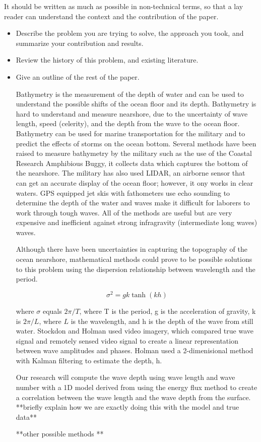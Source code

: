 It should be written as much as possible in non-technical terms, so that a
lay reader can understand the context and the contribution of the paper.

\begin{itemize}

\item Describe the problem you are trying to solve, the approach
you took, and summarize your contribution and results.

\item Review the history of this problem, and existing literature.

\item Give an outline of the rest of the paper.

Bathymetry is the measurement of the depth of water and can be used to understand the possible shifts of the ocean floor and its depth. Bathymetry is hard to understand and measure nearshore, due to the uncertainty of wave length, speed (celerity), and the depth from the wave to the ocean floor. Bathymetry can be used for marine transportation for the military and to predict the effects of storms on the ocean bottom. Several methods have been raised to measure bathymetry by the military such as the use of the Coastal Research Amphibious Buggy, it collects data which captures the bottom of the nearshore. The military has also used LIDAR, an airborne sensor that can get an accurate display of the ocean floor; however, it ony works in clear waters. GPS equipped jet skis with fathometers use echo sounding to determine the depth of the water and waves make it difficult for laborers to work through tough waves. All of the methods are useful but are very expensive and inefficient against strong infragravity (intermediate long waves) waves. 


Although there have been uncertainties in capturing the topography of the ocean nearshore, mathematical methods could prove to be possible solutions to this problem using the dispersion relationship between wavelength and the period.

 $$
 \sigma^2=gk \tanh (kh) 
 $$

where $\sigma$ equals $2\pi / T$, where T is the period, g is the acceleration of gravity, k is $2\pi/L$, where $L$ is the wavelength, and h is the depth of the wave from still water. Stockdon and Holman used video imagery, which compared true wave signal and remotely sensed video signal to create a linear representation between wave amplitudes and phases. Holman used a 2-dimenisional method with Kalman filtering to estimate the depth, h.

Our research will compute the wave depth using wave length and wave number with a 1D model derived from using the energy flux method to create a correlation between the wave length and the wave depth from the surface. **briefly explain how we are exactly doing this with the model and true data**

**other possible methods **





\end{itemize}